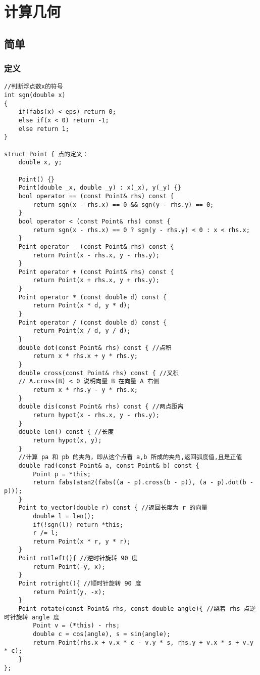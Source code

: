 %
%
\chapter{计算几何}

\section{简单}

\subsection{定义}
\begin{lstlisting}
//判断浮点数x的符号
int sgn(double x)
{
    if(fabs(x) < eps) return 0;
    else if(x < 0) return -1;
    else return 1;
}

struct Point { 点的定义：
    double x, y;

    Point() {}
    Point(double _x, double _y) : x(_x), y(_y) {}
    bool operator == (const Point& rhs) const {
        return sgn(x - rhs.x) == 0 && sgn(y - rhs.y) == 0;
    }
    bool operator < (const Point& rhs) const {
        return sgn(x - rhs.x) == 0 ? sgn(y - rhs.y) < 0 : x < rhs.x;
    }
    Point operator - (const Point& rhs) const {
        return Point(x - rhs.x, y - rhs.y);
    }
    Point operator + (const Point& rhs) const {
        return Point(x + rhs.x, y + rhs.y);
    }
    Point operator * (const double d) const {
        return Point(x * d, y * d);
    }
    Point operator / (const double d) const {
        return Point(x / d, y / d);
    }
    double dot(const Point& rhs) const { //点积
        return x * rhs.x + y * rhs.y;
    }
    double cross(const Point& rhs) const { //叉积
    // A.cross(B) < 0 说明向量 B 在向量 A 右侧
        return x * rhs.y - y * rhs.x;
    }
    double dis(const Point& rhs) const { //两点距离
        return hypot(x - rhs.x, y - rhs.y);
    }
    double len() const { //长度
        return hypot(x, y);
    }
    //计算 pa 和 pb 的夹角，即从这个点看 a,b 所成的夹角,返回弧度值,且是正值
    double rad(const Point& a, const Point& b) const {
        Point p = *this;
        return fabs(atan2(fabs((a - p).cross(b - p)), (a - p).dot(b - p)));
    }
    Point to_vector(double r) const { //返回长度为 r 的向量
        double l = len();
        if(!sgn(l)) return *this;
        r /= l;
        return Point(x * r, y * r);
    }
    Point rotleft(){ //逆时针旋转 90 度
        return Point(-y, x);
    }
    Point rotright(){ //顺时针旋转 90 度
        return Point(y, -x);
    }
    Point rotate(const Point& rhs, const double angle){ //绕着 rhs 点逆时针旋转 angle 度
        Point v = (*this) - rhs;
        double c = cos(angle), s = sin(angle);
        return Point(rhs.x + v.x * c - v.y * s, rhs.y + v.x * s + v.y * c);
    }
};
\end{lstlisting}

